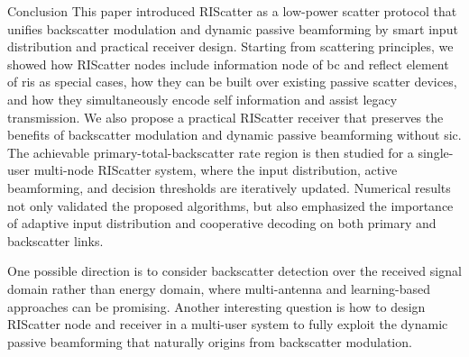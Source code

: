 \documentclass[journal]{IEEEtran}
\begin{document}
\begin{section}{Conclusion}
	This paper introduced RIScatter as a low-power scatter protocol that unifies backscatter modulation and dynamic passive beamforming by smart input distribution and practical receiver design.
	Starting from scattering principles, we showed how RIScatter nodes include information node of \gls{bc} and reflect element of \gls{ris} as special cases, how they can be built over existing passive scatter devices, and how they simultaneously encode self information and assist legacy transmission.
	We also propose a practical RIScatter receiver that preserves the benefits of backscatter modulation and dynamic passive beamforming without \gls{sic}.
	The achievable primary-total-backscatter rate region is then studied for a single-user multi-node RIScatter system, where the input distribution, active beamforming, and decision thresholds are iteratively updated.
	Numerical results not only validated the proposed algorithms, but also emphasized the importance of adaptive input distribution and cooperative decoding on both primary and backscatter links.

	One possible direction is to consider backscatter detection over the received signal domain rather than energy domain, where multi-antenna and learning-based approaches can be promising.
	Another interesting question is how to design RIScatter node and receiver in a multi-user system to fully exploit the dynamic passive beamforming that naturally origins from backscatter modulation.
\end{section}
\end{document}
